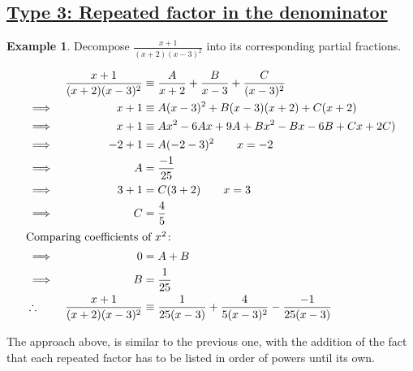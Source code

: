 \documentclass[12pt, a4paper]{report}
\theoremstyle{definition}
\newtheorem{example}{Example}
\begin{document}
	\subsection*{\underline{Type 3: Repeated factor in the denominator}}
	\begin{example}
		Decompose $\frac{x+1}{(x+2)(x-3)^2}$ into its corresponding partial fractions.
	\end{example}
	\begin{alignat*}{2}
		&            & \frac{x+1}{(x+2)(x-3)^2} & \equiv \frac{A}{x+2} + \frac{B}{x-3} + \frac{C}{(x-3)^2}           \\
		& \implies   & x+1                      & \equiv A(x-3)^2 + B(x-3)(x+2) + C(x+2)                             \\
		& \implies   & x+1                      & \equiv Ax^2 - 6Ax +9A + Bx^2-Bx-6B + Cx+2C)                        \\
		& \implies   & -2+1                     & =A(-2-3)^2\tag*{$x=-2$}                                            \\
		& \implies   & A                        & = \frac{-1}{25}                                                    \\
		& \implies   & 3+1                      & =C(3+2)\tag*{$x=3$}                                                \\
		& \implies   & C                        & =\frac{4}{5}                                                       \\
		\intertext{Comparing coefficients of $x^2\colon$}
		& \implies   & 0                        & = A + B                                                            \\
		& \implies   & B                        & = \frac{1}{25}                                                     \\
		& \therefore & \frac{x+1}{(x+2)(x-3)^2} & \equiv \frac{1}{25(x-3)} + \frac{4}{5(x-3)^2} - \frac{-1}{25(x-3)} \\
	\end{alignat*}
	
	The approach above, is similar to the previous one, with the addition of the fact that each repeated factor has to be listed in order of powers until its own.
	\newpage
\end{document}
